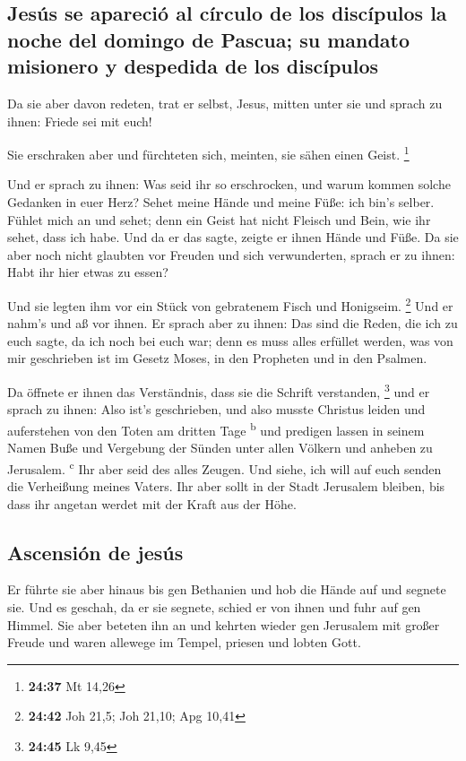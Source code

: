 \hypertarget{jesuxfas-se-apareciuxf3-al-cuxedrculo-de-los-discuxedpulos-la-noche-del-domingo-de-pascua-su-mandato-misionero-y-despedida-de-los-discuxedpulos}{%
\subsection{Jesús se apareció al círculo de los discípulos la noche del
domingo de Pascua; su mandato misionero y despedida de los
discípulos}\label{jesuxfas-se-apareciuxf3-al-cuxedrculo-de-los-discuxedpulos-la-noche-del-domingo-de-pascua-su-mandato-misionero-y-despedida-de-los-discuxedpulos}}

 Da sie aber davon redeten, trat er selbst, Jesus, mitten
unter sie und sprach zu ihnen: Friede sei mit euch!

 Sie erschraken aber und fürchteten sich, meinten, sie
sähen einen Geist. \footnote{\textbf{24:37} Mt 14,26}

 Und er sprach zu ihnen: Was seid ihr so erschrocken, und
warum kommen solche Gedanken in euer Herz?  Sehet meine
Hände und meine Füße: ich bin's selber. Fühlet mich an und sehet; denn
ein Geist hat nicht Fleisch und Bein, wie ihr sehet, dass ich habe.
 Und da er das sagte, zeigte er ihnen Hände und Füße.
 Da sie aber noch nicht glaubten vor Freuden und sich
verwunderten, sprach er zu ihnen: Habt ihr hier etwas zu essen?

 Und sie legten ihm vor ein Stück von gebratenem Fisch
und Honigseim. \footnote{\textbf{24:42} Joh 21,5; Joh 21,10; Apg 10,41}
 Und er nahm's und aß vor ihnen.  Er
sprach aber zu ihnen: Das sind die Reden, die ich zu euch sagte, da ich
noch bei euch war; denn es muss alles erfüllet werden, was von mir
geschrieben ist im Gesetz Moses, in den Propheten und in den Psalmen.

 Da öffnete er ihnen das Verständnis, dass sie die
Schrift verstanden, \footnote{\textbf{24:45} Lk 9,45} 
und er sprach zu ihnen: Also ist's geschrieben, und also musste Christus
leiden und auferstehen von den Toten am dritten Tage \textsuperscript{b}
 und predigen lassen in seinem Namen Buße und Vergebung
der Sünden unter allen Völkern und anheben zu Jerusalem.
\textsuperscript{c}  Ihr aber seid des alles Zeugen.
 Und siehe, ich will auf euch senden die Verheißung
meines Vaters. Ihr aber sollt in der Stadt Jerusalem bleiben, bis dass
ihr angetan werdet mit der Kraft aus der Höhe.

\hypertarget{ascensiuxf3n-de-jesuxfas}{%
\subsection{Ascensión de jesús}\label{ascensiuxf3n-de-jesuxfas}}

 Er führte sie aber hinaus bis gen Bethanien und hob die
Hände auf und segnete sie.  Und es geschah, da er sie
segnete, schied er von ihnen und fuhr auf gen Himmel. 
Sie aber beteten ihn an und kehrten wieder gen Jerusalem mit großer
Freude  und waren allewege im Tempel, priesen und lobten
Gott.
